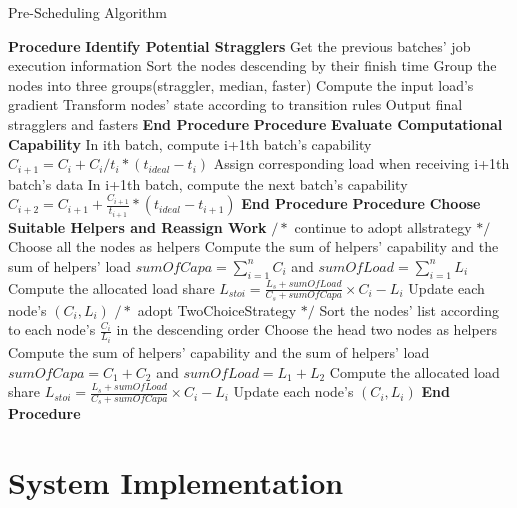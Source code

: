 \documentclass[10pt,conference,compsocconf,letterpaper]{IEEEtran}
\begin{document}
  \begin{algorithm}[htbp]
  \small
  \caption{Pre-Scheduling Algorithm}
  \label{Alg:1}
  \begin{algorithmic}[1]
  \STATE \textbf{Procedure} \textbf{Identify Potential Stragglers}
  \STATE \quad Get the previous batches' job execution information
  \STATE \quad Sort the nodes descending by their finish time
  \STATE \quad Group the nodes into three groups(straggler, median, faster)
  \STATE \quad Compute the input load's gradient
  \STATE \quad Transform nodes' state according to transition rules
  \STATE \quad Output final stragglers and fasters
  \STATE \textbf{End Procedure}
  \STATE \textbf{Procedure} \textbf{Evaluate Computational Capability}
  \STATE \quad In ith batch, compute i+1th batch's capability
  \STATE \quad $C_{i+1} = C_i + C_i/t_i*(t_{ideal}-t_i)$
  \STATE \quad Assign corresponding load when receiving i+1th batch's data
  \STATE \quad In i+1th batch, compute the next batch's capability
  \STATE \quad $C_{i+2} = C_{i+1} + \frac{C_{i+1}}{t_{i+1}}*(t_{ideal}-t_{i+1})$
  \STATE \textbf{End Procedure}
  \STATE \textbf{Procedure} \textbf{Choose Suitable Helpers and Reassign Work}
  \STATE $/*$ continue to adopt allstrategy $*/$
  \STATE Choose all the nodes as helpers
  \STATE Compute the sum of helpers' capability and the sum of helpers' load
  \STATE $sumOfCapa=\sum_{i=1}^n C_i$ and $sumOfLoad=\sum_{i=1}^n L_i$
  \STATE Compute the allocated load share
  \STATE $L_{stoi}=\frac{L_s + sumOfLoad}{C_s + sumOfCapa}\times C_i-L_i$
  \STATE Update each node's $(C_i,L_i)$
  \ENDFOR
  \ENDFOR
  \ELSE
  \STATE $/*$ adopt TwoChoiceStrategy $*/$
  \STATE Sort the nodes' list according to each node's $\frac{C_i}{L_i}$ in the descending order
  \STATE Choose the head two nodes as helpers
  \STATE Compute the sum of helpers' capability and the sum of helpers' load
  \STATE $sumOfCapa = C_1 + C_2$ and $sumOfLoad = L_1 + L_2$
  \STATE Compute the allocated load share
  \STATE $L_{stoi}=\frac{L_s + sumOfLoad}{C_s + sumOfCapa}\times C_i-L_i$
  \STATE Update each node's $(C_i,L_i)$
  \ENDFOR
  \ENDFOR
  \ENDIF
  \STATE \textbf{End Procedure}
  \end{algorithmic}
  \end{algorithm}

\section{System Implementation}
\end{document}
